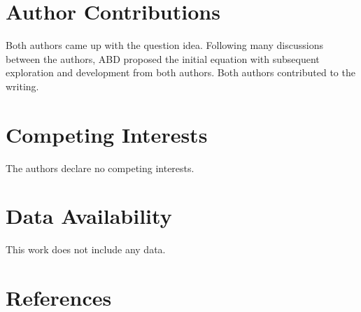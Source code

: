 \documentclass[
]{article}
\begin{document}
\hypertarget{author-contributions}{%
\section{Author Contributions}\label{author-contributions}}

Both authors came up with the question idea. Following many discussions
between the authors, ABD proposed the initial equation with subsequent
exploration and development from both authors. Both authors contributed
to the writing.

\hypertarget{competing-interests}{%
\section{Competing Interests}\label{competing-interests}}

The authors declare no competing interests.

\hypertarget{data-availability}{%
\section{Data Availability}\label{data-availability}}

This work does not include any data.

\hypertarget{references}{%
\section*{References}\label{references}}
\end{document}
